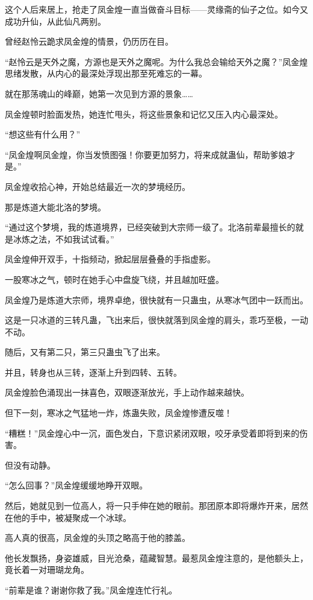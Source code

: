 \begin{this_body}
这个人后来居上，抢走了凤金煌一直当做奋斗目标——灵缘斋的仙子之位。如今又成功升仙，从此仙凡两别。

曾经赵怜云跪求凤金煌的情景，仍历历在目。

“赵怜云是天外之魔，方源也是天外之魔呢。为什么我总会输给天外之魔？”凤金煌思绪发散，从内心的最深处浮现出那至死难忘的一幕。

就在那荡魂山的峰巅，她第一次见到方源的景象……

凤金煌顿时脸面发热，她连忙甩头，将这些景象和记忆又压入内心最深处。

“想这些有什么用？”

“凤金煌啊凤金煌，你当发愤图强！你要更加努力，将来成就蛊仙，帮助爹娘才是。”

凤金煌收拾心神，开始总结最近一次的梦境经历。

那是炼道大能北洛的梦境。

“通过这个梦境，我的炼道境界，已经突破到大宗师一级了。北洛前辈最擅长的就是冰炼之法，不如我试试看。”

凤金煌伸开双手，十指频动，掀起层层叠叠的手指虚影。

一股寒冰之气，顿时在她手心中盘旋飞绕，并且越加旺盛。

凤金煌乃是炼道大宗师，境界卓绝，很快就有一只蛊虫，从寒冰气团中一跃而出。

这是一只冰道的三转凡蛊，飞出来后，很快就落到凤金煌的肩头，乖巧至极，一动不动。

随后，又有第二只，第三只蛊虫飞了出来。

并且，转身也从三转，逐渐上升到四转、五转。

凤金煌脸色涌现出一抹喜色，双眼逐渐放光，手上动作越来越快。

但下一刻，寒冰之气猛地一炸，炼蛊失败，凤金煌惨遭反噬！

“糟糕！”凤金煌心中一沉，面色发白，下意识紧闭双眼，咬牙承受着即将到来的伤害。

但没有动静。

“怎么回事？”凤金煌缓缓地睁开双眼。

然后，她就见到一位高人，将一只手伸在她的眼前。那团原本即将爆炸开来，居然在他的手中，被凝聚成一个冰球。

高人真的很高，凤金煌的头顶之略高于他的膝盖。

他长发飘扬，身姿雄威，目光沧桑，蕴藏智慧。最惹凤金煌注意的，是他额头上，竟长着一对珊瑚龙角。

“前辈是谁？谢谢你救了我。”凤金煌连忙行礼。


\end{this_body}
